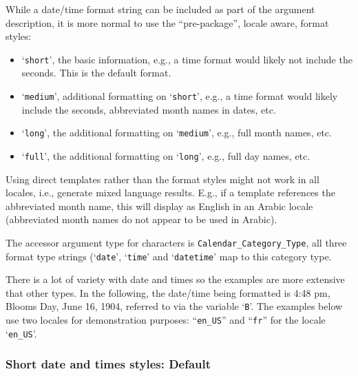 While a date/time format string can be included as part of the argument
description, it is more normal to use the ``pre-package'', locale aware,
format styles:
\begin{itemize}
\item `\texttt{short}', the basic information, e.g., a time format would
    likely not include the seconds.  This is the default format.
\item `\texttt{medium}', additional formatting on `\texttt{short}', e.g.,
    a time format would likely include the seconds, abbreviated month names
    in dates, etc.
\item `\texttt{long}', the additional formatting on `\texttt{medium}', e.g.,
    full month names, etc.
\item `\texttt{full}', the additional formatting on `\texttt{long}', e.g.,
    full day names, etc.
\end{itemize}
Using direct templates rather than the format styles might not work in all
locales, i.e., generate mixed language results.  E.g., if a template references
the abbreviated month name, this will display as English in an Arabic locale
(abbreviated month names do not appear to be used in Arabic).

The accessor argument type for characters is \texttt{Calendar\_Category\_Type},
all three format type strings (`\texttt{date}', `\texttt{time}' and
`\texttt{datetime}' map to this category type.

There is a lot of variety with date and times so the examples are more
extensive that other types.  In the following, the date/time being formatted
is 4:48 pm, Blooms Day, June 16, 1904, referred to via the variable
`\texttt{B}'.  The examples below use two locales for demonstration purposes:
``\texttt{en\_US}'' and ``\texttt{fr}''
for the locale `\texttt{en\_US}'.

\subsubsection{Short date and times styles: Default}

